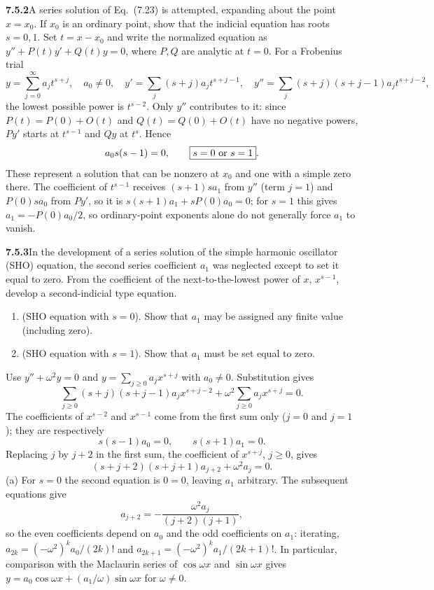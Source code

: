 \par\bigskip
\noindent\textbf{7.5.2}\quad A series solution of Eq.~(7.23) is attempted,
expanding about the point $x=x_{0}$. If $x_{0}$ is an ordinary point, show
that the indicial equation has roots $s=0,1$.
\solution
Set $t=x-x_0$ and write the normalized equation as
$y''+P(t)y'+Q(t)y=0$, where $P,Q$ are analytic at $t=0$.
For a Frobenius trial
\[
y=\sum_{j=0}^\infty a_jt^{s+j},\quad a_0\ne0,
\quad y'=\sum_j(s+j)a_jt^{s+j-1},\quad
 y''=\sum_j(s+j)(s+j-1)a_jt^{s+j-2},
\]
the lowest possible power is $t^{s-2}$. Only $y''$ contributes to it:
since $P(t)=P(0)+O(t)$ and $Q(t)=Q(0)+O(t)$ have no negative powers,
$P y'$ starts at $t^{s-1}$ and $Qy$ at $t^s$. Hence
\[
a_0s(s-1)=0,\qquad \boxed{s=0\ \hbox{or}\ s=1}.
\]
These represent a solution that can be nonzero at $x_0$ and one with a
simple zero there. The coefficient of $t^{s-1}$ receives $(s+1)sa_1$
from $y''$ (term $j=1$) and $P(0)sa_0$ from $Py'$, so it is
$s(s+1)a_1+sP(0)a_0=0$; for $s=1$ this gives
$a_1=-P(0)a_0/2$, so ordinary-point exponents alone do not generally
force $a_1$ to vanish.

\par\bigskip
\noindent\textbf{7.5.3}\quad In the development of a series solution of the
simple harmonic oscillator (SHO) equation, the second series coefficient
$a_{1}$ was neglected except to set it equal to zero. From the coefficient of
the next-to-the-lowest power of $x$, $x^{s-1}$, develop a second-indicial
type equation.
\begin{enumerate}
\item[(a)] (SHO equation with $s=0$). Show that $a_{1}$ may be assigned any
  finite value (including zero).
\item[(b)] (SHO equation with $s=1$). Show that $a_{1}$ must be set equal to
  zero.
\end{enumerate}
\solution
Use $y''+\omega^2y=0$ and
$y=\sum_{j\ge0}a_jx^{s+j}$ with $a_0\ne0$. Substitution gives
\[
\sum_{j\ge0}(s+j)(s+j-1)a_jx^{s+j-2}
 +\omega^2\sum_{j\ge0}a_jx^{s+j}=0.
\]
The coefficients of $x^{s-2}$ and $x^{s-1}$ come from the first sum only
($j=0$ and $j=1$); they are respectively
\[
s(s-1)a_0=0,\qquad \boxed{s(s+1)a_1=0}.
\]
Replacing $j$ by $j+2$ in the first sum, the coefficient of $x^{s+j}$,
$j\ge0$, gives
\[
(s+j+2)(s+j+1)a_{j+2}+\omega^2a_j=0.
\]
(a) For $s=0$ the second equation is $0=0$, leaving $a_1$ arbitrary.
The subsequent equations give
\[
a_{j+2}=-\frac{\omega^2a_j}{(j+2)(j+1)},
\]
so the even coefficients depend on $a_0$ and the odd coefficients on
$a_1$: iterating, $a_{2k}=(-\omega^2)^ka_0/(2k)!$ and
$a_{2k+1}=(-\omega^2)^ka_1/(2k+1)!$. In particular, comparison with the
Maclaurin series of $\cos\omega x$ and $\sin\omega x$ gives
$y=a_0\cos\omega x+(a_1/\omega)\sin\omega x$ for $\omega\ne0$.

